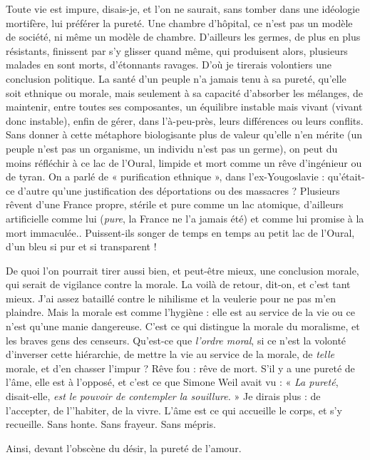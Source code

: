 Toute vie est impure, disais-je, et l’on ne saurait, sans tomber dans une
idéologie mortifère, lui préférer la pureté. Une chambre d’hôpital, ce n’est pas
un modèle de société, ni même un modèle de chambre. D'ailleurs les germes,
de plus en plus résistants, finissent par s’y glisser quand même, qui produisent
alors, plusieurs malades en sont morts, d’étonnants ravages. D'où je tirerais
volontiers une conclusion politique. La santé d’un peuple n’a jamais tenu à sa
pureté, qu'elle soit ethnique ou morale, mais seulement à sa capacité d’absorber
les mélanges, de maintenir, entre toutes ses composantes, un équilibre instable
mais vivant (vivant donc instable), enfin de gérer, dans l’à-peu-près, leurs différences
ou leurs conflits. Sans donner à cette métaphore biologisante plus de
valeur qu’elle n’en mérite (un peuple n’est pas un organisme, un individu n’est
pas un germe), on peut du moins réfléchir à ce lac de l'Oural, limpide et
mort comme un rêve d'ingénieur ou de tyran. On a parlé de « purification
ethnique », dans l’ex-Yougoslavie : qu’était-ce d’autre qu’une justification des
déportations ou des massacres ? Plusieurs rêvent d’une France propre, stérile et
pure comme un lac atomique, d’ailleurs artificielle comme lui ({\it pure}, la France
ne l’a jamais été) et comme lui promise à la mort immaculée.. Puissent-ils
songer de temps en temps au petit lac de l'Oural, d’un bleu si pur et si
transparent !

De quoi l’on pourrait tirer aussi bien, et peut-être mieux, une conclusion
morale, qui serait de vigilance contre la morale. La voilà de retour, dit-on, et
c’est tant mieux. J'ai assez bataillé contre le nihilisme et la veulerie pour ne pas
m'en plaindre. Mais la morale est comme l'hygiène : elle est au service de la vie
ou ce n’est qu’une manie dangereuse. C’est ce qui distingue la morale du moralisme,
et les braves gens des censeurs. Qu'est-ce que {\it l'ordre moral}, si ce n’est la
volonté d’inverser cette hiérarchie, de mettre la vie au service de la morale, de
{\it telle} morale, et d’en chasser l’impur ? Rêve fou : rêve de mort. S’il y a une
pureté de l’âme, elle est à l'opposé, et c’est ce que Simone Weil avait vu : « {\it La
pureté}, disait-elle, {\it est le pouvoir de contempler la souillure.} » Je dirais plus : de
l’accepter, de l’'habiter, de la vivre. L'âme est ce qui accueille le corps, et s’y
recueille. Sans honte. Sans frayeur. Sans mépris.

Ainsi, devant l’obscène du désir, la pureté de l'amour.

